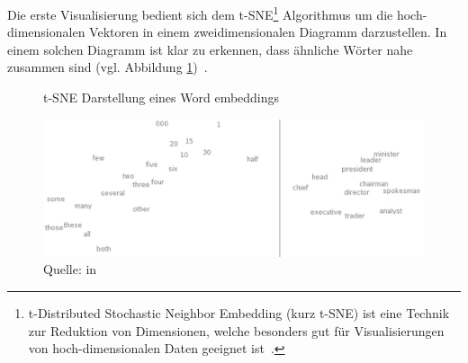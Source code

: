 Die erste Visualisierung bedient sich dem t-SNE\footnote{t-Distributed Stochastic Neighbor Embedding (kurz t-SNE) ist eine Technik zur Reduktion von Dimensionen, welche besonders gut für Visualisierungen von hoch-dimensionalen Daten geeignet ist~\autocite{tSNE}.} Algorithmus um die hoch-dimensionalen Vektoren in einem zweidimensionalen Diagramm darzustellen. In einem solchen Diagramm ist klar zu erkennen, dass ähnliche Wörter nahe zusammen sind (vgl. Abbildung \ref{wordembeddingtsne})~\autocite{Olah2014b}.
\begin{figure}[h!]
    \centering
    \captionsetup{width=.9\linewidth}
    \caption{t-SNE Darstellung eines Word embeddings}
    \includegraphics[width=\textwidth]{graphics/wordmebeddingtsne.jpg}
    \caption*{Quelle: \textcite{Turian2010} in \textcite{Olah2014b}}
    \label{wordembeddingtsne}
\end{figure}


